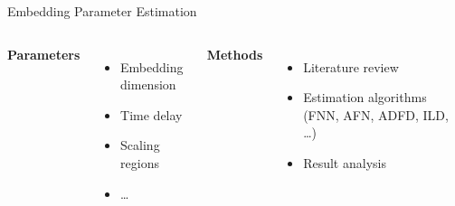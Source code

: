\documentclass{beamer}
\begin{document}
\begin{frame}[t]{Embedding Parameter Estimation}
  \begin{columns}
    \textbf{Parameters}
      \begin{itemize}
        \item Embedding dimension
        \item Time delay
        \item Scaling regions
        \item \ldots
      \end{itemize}

    \textbf{Methods}
      \begin{itemize}
        \item Literature review
        \item Estimation algorithms (FNN, AFN, ADFD, ILD, \ldots)
        \item Result analysis
      \end{itemize}
  \end{columns}
  \vfill
\end{frame}

\end{document}
